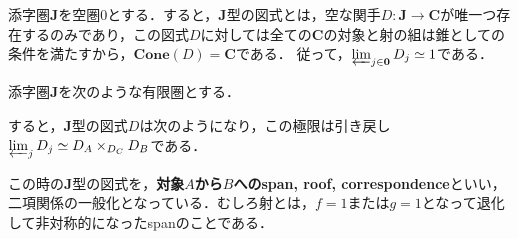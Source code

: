 \documentclass[uplatex, dvipdfmx]{jsarticle}
\begin{document}
\begin{example}[終対象]
    添字圏$\mathbf{J}$を空圏$0$とする．すると，$\mathbf{J}$型の図式とは，空な関手$D:\mathbf{J}\to\mathbf{C}$が唯一つ存在するのみであり，この図式$D$に対しては全ての$\mathbf{C}$の対象と射の組は錐としての条件を満たすから，$\mathbf{Cone}(D)=\mathbf{C}$である．
    従って，$\varprojlim_{j\in\mathbf{0}}D_j\simeq 1$である．
\end{example}

\begin{example}[引き戻し]
    添字圏$\mathbf{J}$を次のような有限圏とする．
    \begin{center}
    \end{center}
    すると，$\mathbf{J}$型の図式$D$は次のようになり，この極限は引き戻し$\varprojlim_{j}D_j\simeq D_A\times_{D_C}D_B$である．
    \begin{center}
    \end{center}
\end{example}
\begin{remark*}
    この時の$\mathbf{J}$型の図式を，\textbf{対象$A$から$B$へのspan, roof, correspondence}といい，二項関係の一般化となっている．むしろ射とは，$f=1$または$g=1$となって退化して非対称的になったspanのことである．
\end{remark*}
\end{document}
